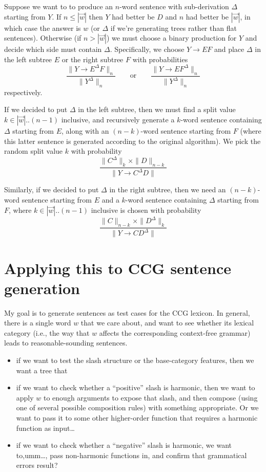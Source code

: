\documentclass[10pt]{article}
\begin{document}
Suppose we want to to produce an $n$-word sentence with sub-derivation $\Delta$ starting from $Y$. If $n \leq |\vec{w}|$ then $Y$ had better be $D$ and $n$ had better be $|\vec{w}|$, in which case the answer is $w$ (or $\Delta$ if we're generating trees rather than flat sentences). Otherwise (if $n > |\vec{w}|$) we must choose a binary production for $Y$ and decide which side must contain $\Delta$. Specifically, we choose $Y \to EF$ and place $\Delta$ in the left subtree $E$ or the right subtree $F$ with probabilities
\[ \frac{\|Y\to E^\Delta F\|_n}{\|Y^\Delta\|_n}
\qquad\mbox{or}\qquad
\frac{\|Y\to EF^\Delta\|_n}{\|Y^\Delta\|_n}
\]
respectively.
\goodbreak{}

If we decided to put $\Delta$ in the left subtree, then we must find a split value $k\in |\vec{w}|..(n{-}1)$ inclusive, and recursively generate a $k$-word sentence containing $\Delta$ starting from $E$, along with an $(n{-}k)$-word sentence starting from $F$ (where this latter sentence is generated according to the
original algorithm). We pick the random split value $k$ with probability
\[
    \frac{\|C^\Delta\|_k\times \|D\|_{n{-}k}}{\|Y \to C^\Delta D\|}
\]


Similarly, if we decided to put $\Delta$ in the right subtree, then we need an $(n{-}k)$-word sentence starting from $E$ and a $k$-word sentence containing $\Delta$ starting from $F$, where $k \in |\vec{w}|..(n{-}1)$ inclusive is chosen with probability
\[
    \frac{\|C\|_{n{-}k}\times \|D^\Delta\|_k}{\|Y \to CD^\Delta\|}
\]

\section{Applying this to CCG sentence generation}

My goal is to generate sentences as test cases for the CCG lexicon. In general, there is a single word $w$ that we care about, and want to see whether its lexical category (i.e., the way that $w$ affects the corresponding context-free grammar) leads to reasonable-sounding sentences.

\begin{itemize}
\item if we want to test the slash structure or the base-category features, then we want a tree that
\item if we want to check whether a ``positive'' slash is harmonic, then we want to apply $w$ to enough arguments to expose that slash, and then compose (using one of several possible composition rules) with something appropriate.  Or we want to pass it to some other higher-order function that requires a harmonic function as input\ldots
\item if we want to check whether a ``negative'' slash is harmonic, we want to,umm\ldots, pass non-harmonic functions in, and confirm that grammatical errors result?
\end{itemize}
\end{document}
